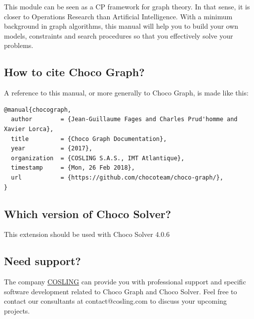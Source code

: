 \documentclass{article}
\begin{document}
This module can be seen as a CP framework for graph theory. In that sense, it is closer to Operations Research than Artificial Intelligence. With a minimum background in graph algorithms, this manual will help you to build your own models, constraints and search procedures so that you effectively solve your problems. 



\subsection{How to cite Choco Graph?}

A reference to this manual, or more generally to Choco Graph, is made like this:
\begin{lstlisting}
@manual{chocograph,
  author        = {Jean-Guillaume Fages and Charles Prud'homme and Xavier Lorca},
  title         = {Choco Graph Documentation},
  year          = {2017},
  organization  = {COSLING S.A.S., IMT Atlantique},
  timestamp     = {Mon, 26 Feb 2018},
  url           = {https://github.com/chocoteam/choco-graph/},
}
\end{lstlisting}

\subsection{Which version of Choco Solver?}

This extension should be used with Choco Solver 4.0.6

\subsection{Need support?}

The company \href{https://www.cosling.com/}{COSLING} can provide you with professional support and specific software development related to Choco Graph and Choco Solver. Feel free to contact our consultants at contact@cosling.com to discuss your upcoming projects.
\end{document}
